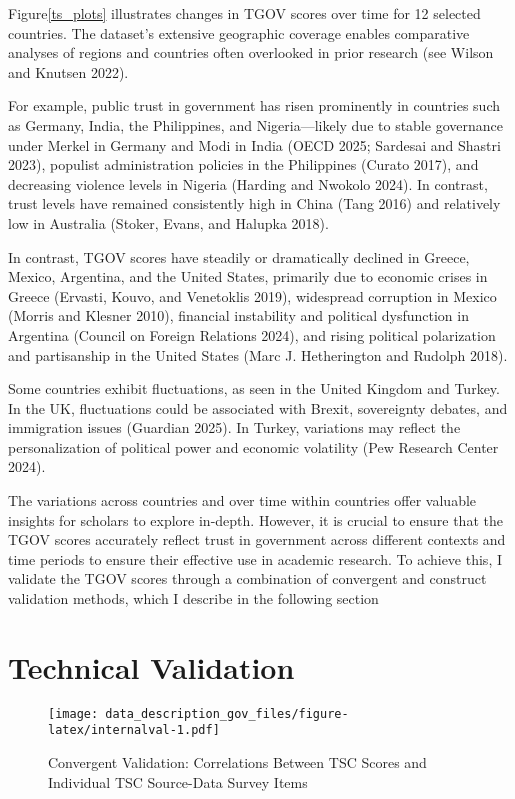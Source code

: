 \documentclass[
  12pt,
]{article}
\begin{document}
Figure\nobreakspace{}\ref{ts_plots} illustrates changes in TGOV scores over time for 12 selected countries.
The dataset's extensive geographic coverage enables comparative analyses of regions and countries often overlooked in prior research (see Wilson and Knutsen 2022).

For example, public trust in government has risen prominently in countries such as Germany, India, the Philippines, and Nigeria---likely due to stable governance under Merkel in Germany and Modi in India (OECD 2025; Sardesai and Shastri 2023), populist administration policies in the Philippines (Curato 2017), and decreasing violence levels in Nigeria (Harding and Nwokolo 2024).
In contrast, trust levels have remained consistently high in China (Tang 2016) and relatively low in Australia (Stoker, Evans, and Halupka 2018).

In contrast, TGOV scores have steadily or dramatically declined in Greece, Mexico, Argentina, and the United States, primarily due to economic crises in Greece (Ervasti, Kouvo, and Venetoklis 2019), widespread corruption in Mexico (Morris and Klesner 2010), financial instability and political dysfunction in Argentina (Council on Foreign Relations 2024), and rising political polarization and partisanship in the United States (Marc J. Hetherington and Rudolph 2018).

Some countries exhibit fluctuations, as seen in the United Kingdom and Turkey.
In the UK, fluctuations could be associated with Brexit, sovereignty debates, and immigration issues (Guardian 2025).
In Turkey, variations may reflect the personalization of political power and economic volatility (Pew Research Center 2024).

The variations across countries and over time within countries offer valuable insights for scholars to explore in-depth.
However, it is crucial to ensure that the TGOV scores accurately reflect trust in government across different contexts and time periods to ensure their effective use in academic research.
To achieve this, I validate the TGOV scores through a combination of convergent and construct validation methods, which I describe in the following section

\section{Technical Validation}\label{technical-validation}

\begin{figure}
\centering
\texttt{[image: data\_description\_gov\_files/figure-latex/internalval-1.pdf]}
\caption{\label{fig:internalval}Convergent Validation: Correlations Between TSC Scores and Individual TSC Source-Data Survey Items \label{internal_val}}
\end{figure}
\end{document}
